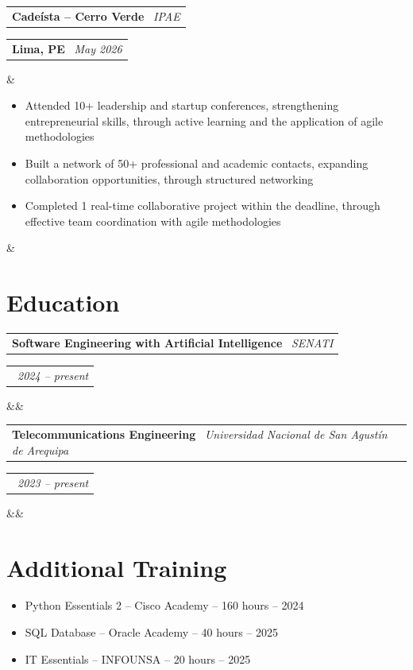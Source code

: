 \documentclass[11pt,a4paper,sans]{moderncv}
\makeatletter
\newcommand*{\customcventry}[7][.13em]{
\begin{tabular}{@{}l}
{\bfseries #4} \
{\itshape #3}
\end{tabular}
\hfill
\begin{tabular}{l@{}}
{\bfseries #5} \
{\itshape #2}
\end{tabular}
\ifx&#7&%
\else{\
\begin{minipage}{\maincolumnwidth}%
\small#7%
\end{minipage}}\fi%
\par\addvspace{#1}}
\makeatother
\begin{document}
\customcventry{May 2026}{{{IPAE}}}{Cadeísta – Cerro Verde}{Lima, PE}{}{
{\begin{itemize}[leftmargin=0.6cm, label={\textbullet}]
\item Attended 10+ leadership and startup conferences, strengthening entrepreneurial skills, through active learning and the application of agile methodologies
\item Built a network of 50+ professional and academic contacts, expanding collaboration opportunities, through structured networking
\item Completed 1 real-time collaborative project within the deadline, through effective team coordination with agile methodologies
\end{itemize}}}

\section{Education}
\customcventry{2024 – present}{SENATI}{Software Engineering with Artificial Intelligence}{}{}{}

\vspace{0.5cm}
\customcventry{2023 – present}{Universidad Nacional de San Agustín de Arequipa}{Telecommunications Engineering}{}{}{}


\section{Additional Training}
{\begin{itemize}[label=\textbullet]
      \item Python Essentials 2 – Cisco Academy – 160 hours – 2024
      \item SQL Database – Oracle Academy – 40 hours – 2025
      \item IT Essentials – INFOUNSA – 20 hours – 2025
  \end{itemize}} 


\end{document}

